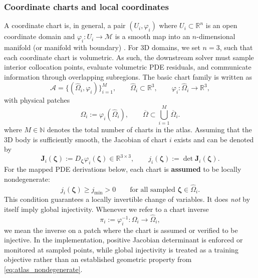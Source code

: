 \documentclass[sort&compress]{svjour3} %
\begin{document}
\subsubsection{Coordinate charts and local coordinates}
A coordinate chart is, in general, a pair $(U_i,\varphi_i)$ where $U_i\subset\mathbb{R}^n$ is an open coordinate domain and $\varphi_i:U_i\to\mathcal{M}$ is a smooth map into an $n$-dimensional manifold (or manifold with boundary) \citep{lee2012introduction}. For 3D domains, we set $n=3$, such that each coordinate chart is volumetric. As such, the downstream solver must sample interior collocation points, evaluate volumetric PDE residuals, and communicate information through overlapping subregions. The basic chart family is written as
\begin{equation}
\mathcal{A}=\{(\widehat{\Omega}_i,\varphi_i)\}_{i=1}^{M},
\qquad
\widehat{\Omega}_i \subset \mathbb{R}^3,
\qquad
\varphi_i:\widehat{\Omega}_i \rightarrow \mathbb{R}^3,
\label{eq:atlas_def}
\end{equation}
with physical patches
\begin{equation}
\Omega_i := \varphi_i(\widehat{\Omega}_i),
\qquad
\overline{\Omega}\subset \bigcup_{i=1}^{M}\overline{\Omega}_i.
\label{eq:atlas_cover}
\end{equation}
where $M\in\mathbb{N}$ denotes the total number of charts in the atlas. Assuming that the 3D body is sufficiently smooth, the Jacobian of chart $i$ exists and can be denoted by
\begin{equation}
\mathbf{J}_i(\boldsymbol{\zeta}) := D_{\boldsymbol{\zeta}} \varphi_i(\boldsymbol{\zeta})\in\mathbb{R}^{3\times 3},
\qquad
j_i(\boldsymbol{\zeta}):=\det \mathbf{J}_i(\boldsymbol{\zeta}).
\label{eq:atlas_jac}
\end{equation}
For the mapped PDE derivations below, each chart is \textbf{assumed} to be locally nondegenerate:
\begin{equation}
j_i(\boldsymbol{\zeta})\ge j_{\min}>0
\qquad \text{for all sampled }\boldsymbol{\zeta}\in \widehat{\Omega}_i.
\label{eq:atlas_nondegenerate}
\end{equation}
This condition guarantees a locally invertible change of variables. It does \emph{not} by itself imply global injectivity. Whenever we refer to a chart inverse
\begin{equation}
\pi_i := \varphi_i^{-1}:\Omega_i\rightarrow \widehat{\Omega}_i,
\label{eq:atlas_inverse}
\end{equation}
we mean the inverse on a patch where the chart is assumed or verified to be injective. In the implementation, positive Jacobian determinant is enforced or monitored at sampled points, while global injectivity is treated as a training objective rather than an established geometric property from \eqref{eq:atlas_nondegenerate}.
\end{document}
